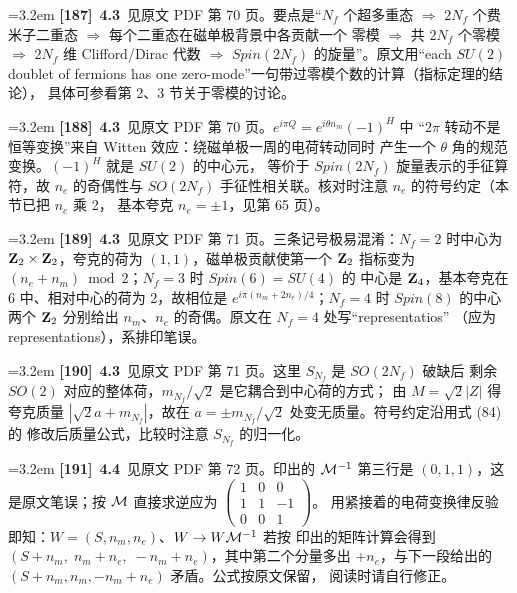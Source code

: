 \par
\par\medskip\noindent\hangindent=3.2em \textbf{[187]}~\textbf{4.3}~见原文 PDF 第 70 页。要点是“$N_f$ 个超多重态 $\Rightarrow$ $2N_f$ 个费米子二重态 $\Rightarrow$ 每个二重态在磁单极背景中各贡献一个 零模 $\Rightarrow$ 共 $2N_f$ 个零模 $\Rightarrow$ $2N_f$ 维 Clifford/Dirac 代数 $\Rightarrow$ $Spin(2N_f)$ 的旋量”。原文用“each $SU(2)$ doublet of fermions has one zero-mode”一句带过零模个数的计算（指标定理的结论）， 具体可参看第 2、3 节关于零模的讨论。
\par
\par\medskip\noindent\hangindent=3.2em \textbf{[188]}~\textbf{4.3}~见原文 PDF 第 70 页。$e^{i\pi Q}=e^{i\theta n_m}(-1)^H$ 中 “$2\pi$ 转动不是恒等变换”来自 Witten 效应：绕磁单极一周的电荷转动同时 产生一个 $\theta$ 角的规范变换。$(-1)^H$ 就是 $SU(2)$ 的中心元， 等价于 $Spin(2N_f)$ 旋量表示的手征算符，故 $n_e$ 的奇偶性与 $SO(2N_f)$ 手征性相关联。核对时注意 $n_e$ 的符号约定（本节已把 $n_e$ 乘 2， 基本夸克 $n_e=\pm1$，见第 65 页）。
\par
\par\medskip\noindent\hangindent=3.2em \textbf{[189]}~\textbf{4.3}~见原文 PDF 第 71 页。三条记号极易混淆：$N_f=2$ 时中心为 ${\bf Z}_2\times{\bf Z}_2$，夸克的荷为 $(1,1)$，磁单极贡献使第一个 ${\bf Z}_2$ 指标变为 $(n_e+n_m)\bmod2$；$N_f=3$ 时 $Spin(6)=SU(4)$ 的 中心是 ${\bf Z}_4$，基本夸克在 $6$ 中、相对中心的荷为 2，故相位是 $e^{i\pi(n_m+2n_e)/4}$；$N_f=4$ 时 $Spin(8)$ 的中心两个 ${\bf Z}_2$ 分别给出 $n_m$、$n_e$ 的奇偶。原文在 $N_f=4$ 处写“representatios” （应为 representations），系排印笔误。
\par
\par\medskip\noindent\hangindent=3.2em \textbf{[190]}~\textbf{4.3}~见原文 PDF 第 71 页。这里 $S_{N_f}$ 是 $SO(2N_f)$ 破缺后 剩余 $SO(2)$ 对应的整体荷，$m_{N_f}/\sqrt2$ 是它耦合到中心荷的方式； 由 $M=\sqrt2|Z|$ 得夸克质量 $|\sqrt2a+m_{N_f}|$，故在 $a=\pm m_{N_f}/\sqrt2$ 处变无质量。符号约定沿用式 (84) 的 修改后质量公式，比较时注意 $S_{N_f}$ 的归一化。
\par
\par\medskip\noindent\hangindent=3.2em \textbf{[191]}~\textbf{4.4}~见原文 PDF 第 72 页。印出的 ${\cal M}^{-1}$ 第三行是 $(0,1,1)$，这是原文笔误；按 ${\cal M}$ 直接求逆应为 $\left(\begin{array}{ccc}1&0&0\\1&1&-1\\0&0&1\end{array}\right)$。 用紧接着的电荷变换律反验即知：$W=(S,n_m,n_e)$、$W\to W{\cal M}^{-1}$ 若按 印出的矩阵计算会得到 $(S+n_m,\;n_m+n_e,\;-n_m+n_e)$，其中第二个分量多出 $+n_e$，与下一段给出的 $(S+n_m,n_m,-n_m+n_e)$ 矛盾。公式按原文保留， 阅读时请自行修正。
